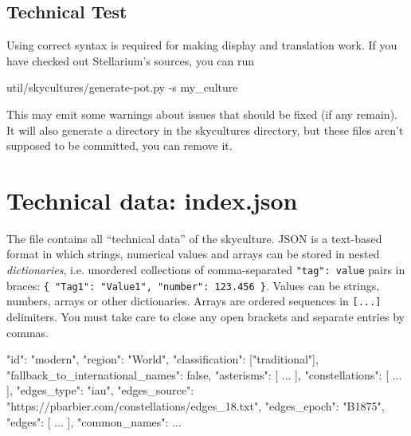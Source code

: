 \subsection{Technical Test}
\label{sec:skycultures:Testing}

Using correct syntax is required for making display and translation work. 
If you have checked out Stellarium's sources, you can run

\begin{commands}
util/skycultures/generate-pot.py -s my_culture
\end{commands}
This may emit some warnings about issues that should be fixed (if any remain). 
It will also generate a  directory in the skycultures directory, 
but these files aren't supposed to be committed, you can remove it.





\section{Technical data: index.json}
\label{sec:skycultures:index.json}
\label{SC:index.json}


The file  contains all ``technical data'' of the skyculture. 
JSON is a text-based format in which strings, numerical values and arrays can be stored in nested \emph{dictionaries}, 
i.e. unordered collections of comma-separated \texttt{"tag": value} pairs in braces: \texttt{\{ "Tag1": "Value1", "number": 123.456 \}}. 
Values can be strings, numbers, arrays or other dictionaries. Arrays are ordered sequences in \texttt{[...]} delimiters.  
You must take care to close any open brackets and separate entries by commas. 


\begin{jsonfile}[\scriptsize]
{
  "id": "modern",
  "region": "World",
  "classification": ["traditional"],
  "fallback_to_international_names": false,
  "asterisms": [ ... ],
  "constellations": [ ... ],
  "edges_type": "iau",
  "edges_source": "https://pbarbier.com/constellations/edges_18.txt",
  "edges_epoch": "B1875",
  "edges": [ ... ],
  "common_names": { ... }
}
\end{jsonfile}

